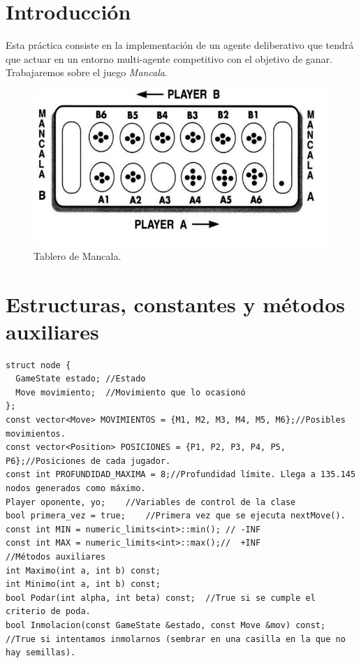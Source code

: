 \documentclass[12pt,spanish]{article}
\begin{document}
\section{Introducción}

Esta práctica consiste en la implementación de un agente deliberativo que tendrá que actuar en un entorno multi-agente competitivo con el objetivo de ganar. Trabajaremos sobre el juego \emph{Mancala}.

\begin{figure}[H]
\centering
\includegraphics[scale=0.5]{mancala.png}
\caption{Tablero de Mancala.}
\end{figure}

\section{Estructuras, constantes y métodos auxiliares}

\begin{verbatim}
struct node {
  GameState estado;	//Estado
  Move movimiento;	//Movimiento que lo ocasionó
};
const vector<Move> MOVIMIENTOS = {M1, M2, M3, M4, M5, M6};//Posibles movimientos.
const vector<Position> POSICIONES = {P1, P2, P3, P4, P5, P6};//Posiciones de cada jugador.
const int PROFUNDIDAD_MAXIMA = 8;//Profundidad límite. Llega a 135.145 nodos generados como máximo.
Player oponente, yo;	//Variables de control de la clase
bool primera_vez = true;	//Primera vez que se ejecuta nextMove().
const int MIN = numeric_limits<int>::min();	// -INF
const int MAX = numeric_limits<int>::max();//  +INF
//Métodos auxiliares
int Maximo(int a, int b) const;
int Minimo(int a, int b) const;
bool Podar(int alpha, int beta) const;	//True si se cumple el criterio de poda.
bool Inmolacion(const GameState &estado, const Move &mov) const; //True si intentamos inmolarnos (sembrar en una casilla en la que no hay semillas).
\end{verbatim}
\end{document}
